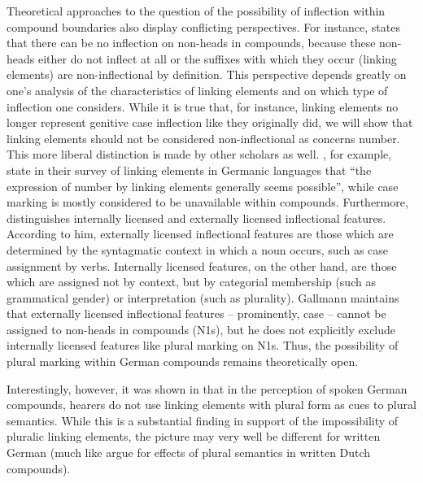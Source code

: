 Theoretical approaches to the question of the possibility of inflection within compound boundaries also display conflicting perspectives.
For instance, \citet[9]{Schluecker2012} states that there can be no inflection on non-heads in compounds, because these non-heads either do not inflect at all or the suffixes with which they occur (\ie linking elements) are non-inflectional by definition.
This perspective depends greatly on one's analysis of the characteristics of linking elements and on which type of inflection one considers.
While it is true that, for instance, linking elements no longer represent genitive case inflection like they originally did, we will show that linking elements should not be considered non-inflectional as concerns number.
This more liberal distinction is made by other scholars as well.
\citet[577]{FuhrhopKuerschner2015}, for example, state in their survey of linking elements in Germanic languages that ``the expression of number by linking elements generally seems possible'', while case marking is mostly considered to be unavailable within compounds.
Furthermore, \citet[178--180]{Gallmann1998} distinguishes internally licensed and externally licensed inflectional features.
According to him, externally licensed inflectional features are those which are determined by the syntagmatic context in which a noun occurs, such as case assignment by verbs.
Internally licensed features, on the other hand, are those which are assigned not by context, but by categorial membership (such as grammatical gender) or interpretation (such as plurality).
Gallmann maintains that externally licensed inflectional features -- prominently, case -- cannot be assigned to non-heads in compounds (N1s), but he does not explicitly exclude internally licensed features like plural marking on N1s.
Thus, the possibility of plural marking within German compounds remains theoretically open.

Interestingly, however, it was shown in \citet{KoesterEa2004} that in the perception of spoken German compounds, hearers do not use linking elements with plural form as cues to plural semantics.
While this is a substantial finding in support of the impossibility of pluralic linking elements, the picture may very well be different for written German (much like \citealt{SchreuderEa1998} argue for effects of plural semantics in written Dutch compounds).


